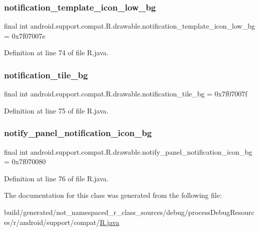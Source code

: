 \subsubsection{\texorpdfstring{notification\_template\_icon\_low\_bg}{notification\_template\_icon\_low\_bg}}
{\footnotesize\ttfamily final int android.\+support.\+compat.\+R.\+drawable.\+notification\+\_\+template\+\_\+icon\+\_\+low\+\_\+bg = 0x7f07007e\hspace{0.3cm}{\ttfamily [static]}}



Definition at line 74 of file R.\+java.

\mbox{\label{classandroid_1_1support_1_1compat_1_1_r_1_1drawable_a6ab5153e2c67f18967cc5d392013321d}} 
\subsubsection{\texorpdfstring{notification\_tile\_bg}{notification\_tile\_bg}}
{\footnotesize\ttfamily final int android.\+support.\+compat.\+R.\+drawable.\+notification\+\_\+tile\+\_\+bg = 0x7f07007f\hspace{0.3cm}{\ttfamily [static]}}



Definition at line 75 of file R.\+java.

\mbox{\label{classandroid_1_1support_1_1compat_1_1_r_1_1drawable_ac2f70454d50b1ec6c8a6a761a78edcb2}} 
\subsubsection{\texorpdfstring{notify\_panel\_notification\_icon\_bg}{notify\_panel\_notification\_icon\_bg}}
{\footnotesize\ttfamily final int android.\+support.\+compat.\+R.\+drawable.\+notify\+\_\+panel\+\_\+notification\+\_\+icon\+\_\+bg = 0x7f070080\hspace{0.3cm}{\ttfamily [static]}}



Definition at line 76 of file R.\+java.



The documentation for this class was generated from the following file\+:\begin{DoxyCompactItemize}
\item 
build/generated/not\+\_\+namespaced\+\_\+r\+\_\+class\+\_\+sources/debug/process\+Debug\+Resources/r/android/support/compat/\mbox{\hyperlink{android_2support_2compat_2_r_8java}{R.\+java}}\end{DoxyCompactItemize}
